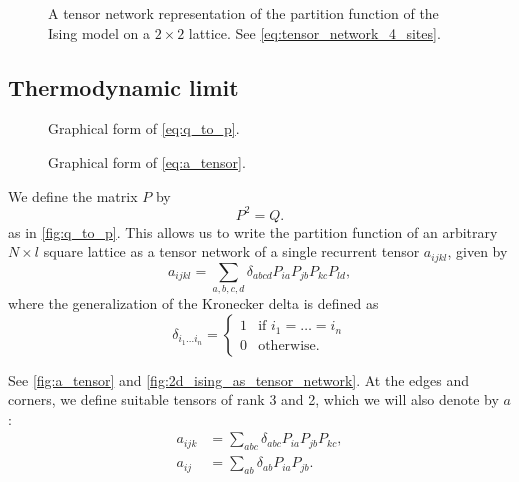\begin{figure}
  
  \caption{A tensor network representation of the partition function of the Ising model on
  a $2 \times 2$ lattice. See \autoref{eq:tensor_network_4_sites}.}
  \label{fig:tensor_network_4_sites}
\end{figure}


\subsection{Thermodynamic limit}
\begin{figure}
  
  \caption{Graphical form of \autoref{eq:q_to_p}.}
  \label{fig:q_to_p}
\end{figure}

\begin{figure}
  
  \caption{Graphical form of \autoref{eq:a_tensor}.}
  \label{fig:a_tensor}
\end{figure}

We define the matrix $P$ by
\begin{equation}\label{eq:q_to_p}
  P^2 = Q.
\end{equation}
as in \autoref{fig:q_to_p}. This allows us to write the partition function of an arbitrary
$N \times l$ square lattice as a tensor network of a single recurrent tensor $a_{i j k
l}$, given by
\begin{equation}\label{eq:a_tensor}
  a_{i j k l} = \sum_{a, b, c, d} \delta_{a b c d} P_{i a} P_{j b} P_{k c} P_{l d},
\end{equation}
where the generalization of the Kronecker delta is defined as
\begin{equation}
  \delta_{i_1 \dots i_n} =
  \begin{cases}
    1 & \text{if } i_1 = \ldots = i_n \\
    0 & \text{otherwise.}
  \end{cases}
\end{equation}

See \autoref{fig:a_tensor} and \autoref{fig:2d_ising_as_tensor_network}. At the edges and
corners, we define suitable tensors of rank 3 and 2, which we will also denote by $a$:
\begin{align*}
  a_{i j k} &= \sum_{a b c} \delta_{a b c} P_{i a} P_{j b} P_{k c}, \\
  a_{i j} &= \sum_{a b} \delta_{a b} P_{i a} P_{j b}.
\end{align*}

